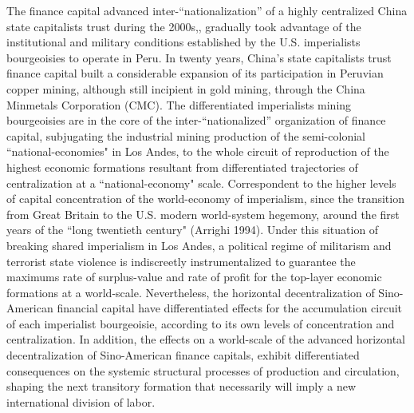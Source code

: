 \documentclass[]{interact}
\theoremstyle{plain}%
\theoremstyle{definition}
\theoremstyle{remark}
\begin{document}
The finance capital advanced inter-“nationalization” of a highly centralized China state capitalists trust during the 2000s,, gradually took advantage of the institutional and military conditions established by the U.S. imperialists bourgeoisies to operate in Peru. In twenty years, China's state capitalists trust finance capital built a considerable expansion of its participation in Peruvian copper mining, although still incipient in gold mining, through the China Minmetals Corporation (CMC). The differentiated imperialists mining bourgeoisies are in the core of the inter-“nationalized” organization of finance capital, subjugating the industrial mining production of the semi-colonial “national-economies" in Los Andes, to the whole circuit of reproduction of the highest economic formations resultant from differentiated trajectories of centralization at a “national-economy" scale. Correspondent to the higher levels of capital concentration of the world-economy of imperialism, since the transition from Great Britain to the U.S. modern world-system hegemony, around the first years of the “long twentieth century" (Arrighi 1994).
Under this situation of breaking shared imperialism in Los Andes, a political regime of militarism and terrorist state violence is indiscreetly instrumentalized to guarantee the maximums rate of surplus-value and rate of profit for the top-layer economic formations at a world-scale. Nevertheless, the horizontal decentralization of Sino- American financial capital have differentiated effects for the accumulation circuit of each imperialist bourgeoisie, according to its own levels of concentration and centralization. In addition, the effects on a world-scale of the advanced horizontal decentralization of Sino-American finance capitals, exhibit differentiated consequences on the systemic structural processes of production and circulation, shaping the next transitory formation that necessarily will imply a new international division of labor.
\end{document}
